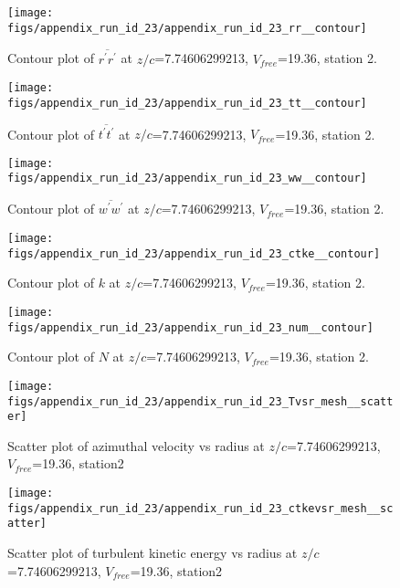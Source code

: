 \begin{figure}[H]
\centering
\texttt{[image: figs/appendix\_run\_id\_23/appendix\_run\_id\_23\_rr\_\_contour]}
\caption{Contour plot of $\overline{r^\prime r^\prime}$ at $z/c$=7.74606299213, $V_{free}$=19.36, station 2.}
\label{fig:appendix_run_id_23_rr__contour}
\end{figure}


\begin{figure}[H]
\centering
\texttt{[image: figs/appendix\_run\_id\_23/appendix\_run\_id\_23\_tt\_\_contour]}
\caption{Contour plot of $\overline{t^\prime t^\prime}$ at $z/c$=7.74606299213, $V_{free}$=19.36, station 2.}
\label{fig:appendix_run_id_23_tt__contour}
\end{figure}


\begin{figure}[H]
\centering
\texttt{[image: figs/appendix\_run\_id\_23/appendix\_run\_id\_23\_ww\_\_contour]}
\caption{Contour plot of $\overline{w^\prime w^\prime}$ at $z/c$=7.74606299213, $V_{free}$=19.36, station 2.}
\label{fig:appendix_run_id_23_ww__contour}
\end{figure}


\begin{figure}[H]
\centering
\texttt{[image: figs/appendix\_run\_id\_23/appendix\_run\_id\_23\_ctke\_\_contour]}
\caption{Contour plot of $k$ at $z/c$=7.74606299213, $V_{free}$=19.36, station 2.}
\label{fig:appendix_run_id_23_ctke__contour}
\end{figure}


\begin{figure}[H]
\centering
\texttt{[image: figs/appendix\_run\_id\_23/appendix\_run\_id\_23\_num\_\_contour]}
\caption{Contour plot of $N$ at $z/c$=7.74606299213, $V_{free}$=19.36, station 2.}
\label{fig:appendix_run_id_23_num__contour}
\end{figure}


\begin{figure}[H]
\centering
\texttt{[image: figs/appendix\_run\_id\_23/appendix\_run\_id\_23\_Tvsr\_mesh\_\_scatter]}
\caption{Scatter plot of azimuthal velocity vs radius at $z/c$=7.74606299213, $V_{free}$=19.36, station2}
\label{fig:appendix_run_id_23_Tvsr_mesh__scatter}
\end{figure}


\begin{figure}[H]
\centering
\texttt{[image: figs/appendix\_run\_id\_23/appendix\_run\_id\_23\_ctkevsr\_mesh\_\_scatter]}
\caption{Scatter plot of turbulent kinetic energy vs radius at $z/c$=7.74606299213, $V_{free}$=19.36, station2}
\label{fig:appendix_run_id_23_ctkevsr_mesh__scatter}
\end{figure}


